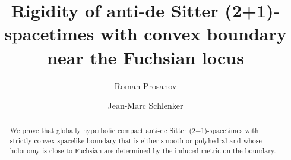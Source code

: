 \documentclass[12pt]{amsart}
\title[]{Rigidity of anti-de Sitter (2+1)-spacetimes with convex boundary near the Fuchsian locus}
\author{Roman Prosanov}
\author{Jean-Marc Schlenker}
\theoremstyle{definition}
\numberwithin{equation}{section}
\theoremstyle{definition}
\theoremstyle{remark}
\begin{document}
\begin{abstract}
We prove that globally hyperbolic compact anti-de Sitter (2+1)-spacetimes with strictly convex spacelike boundary that is either smooth or polyhedral and whose holonomy is close to Fuchsian are determined by the induced metric on the boundary.
\end{abstract}

\maketitle

\tableofcontents












\end{document}
